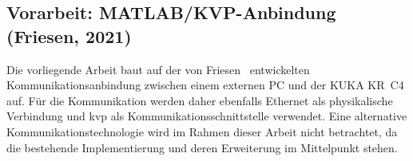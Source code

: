 \subsection{Vorarbeit: MATLAB/KVP-Anbindung (Friesen, 2021)}
\label{sec:friesen}

Die vorliegende Arbeit baut auf der von Friesen~\cite{friesen2021}
entwickelten Kommunikationsanbindung zwischen einem externen PC und
der KUKA KR~C4 auf. Für die Kommunikation werden daher ebenfalls
Ethernet als physikalische Verbindung und \ac{kvp} als
Kommunikationsschnittstelle verwendet. Eine alternative
Kommunikationstechnologie wird im Rahmen dieser Arbeit nicht betrachtet,
da die bestehende Implementierung und deren Erweiterung im Mittelpunkt
stehen.

